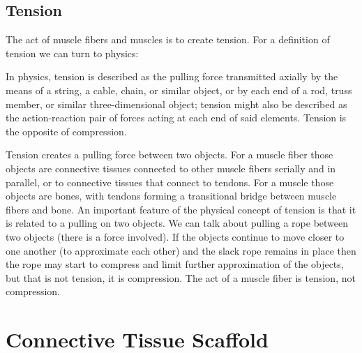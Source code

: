\subsection{Tension}

The act of muscle fibers and muscles is to create tension. For a definition of tension we can turn to physics: 

\begin{displayquote}
In physics, tension is described as the pulling force transmitted axially by the means of a string, a cable, chain, or similar object, or by each end of a rod, truss member, or similar three-dimensional object; tension might also be described as the action-reaction pair of forces acting at each end of said elements. Tension is the opposite of compression.\footnotemark{} 
\end{displayquote}

Tension creates a pulling force between two objects. For a muscle fiber those objects are connective tissues connected to other muscle fibers serially and in parallel, or to connective tissues that connect to tendons. For a muscle those objects are bones, with tendons forming a transitional bridge between muscle fibers and bone. An important feature of the physical concept of tension is that it is related to a pulling on two objects. We can talk about pulling a rope between two objects (there is a force involved). If the objects continue to move closer to one another (to approximate each other) and the slack rope remains in place then the rope may start to compress and limit further approximation of the objects, but that is not tension, it is compression. The act of a muscle fiber is tension, not compression.\footnotemark{} 

\section{Connective Tissue Scaffold}

